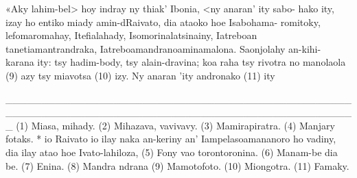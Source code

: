 «Aky lahim-bel> hoy indray ny thiak' Ibonia, <ny anaran' ity sabo-
hako ity, izay ho entiko miady amin-dRaivato, dia ataoko hoe Isabohama-
romitoky, lefomaromahay, Itefialahady, Isomorinalatsinainy, Iatreboan
tanetiamantrandraka, Iatreboamandranoaminamalona. Saonjolahy an-kihi-
karana ity: tsy hadim-body, tsy alain-dravina; koa raha tsy rivotra no
manolaola (9) azy tsy miavotsa (10) izy. Ny anaran 'ity andronako (11) ity

_________________________________________________________________________________________________
(1) Miasa, mihady. 
(2) Mihazava, vavivavy. 
(3) Mamirapiratra. 
(4) Manjary fotaks. * io Raivato io ilay naka an-keriny an' Iampelasoamananoro ho vadiny, dia ilay atao hoe Ivato-lahiloza, 
(5) Fony vao torontoronina. 
(6) Manam-be dia be. 
(7) Enina. 
(8) Mandra ndrana
(9) Mamotofoto. 
(10) Miongotra. 
(11) Famaky.
